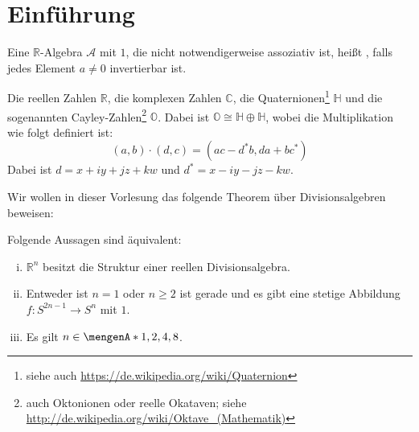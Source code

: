 
\newcommand{\fach}{$K$-Theorie und die Hopf-Invariante}
\newcommand{\semester}{SoSe 2015}
\newcommand{\homepage}{https://wwwmath.uni-muenster.de/reine/u/topos/lehre/SS2015/KTheorie-Hopf/Hopf.html}

\newcommand{\prof}{Dr.\ Ulrich Penning}
\publishers{\scalebox{14}{$K$}}



\maketitle
\begin{abstract}

\end{abstract}

\tableofcontents
\cleardoubleoddemptypage

\setcounter{page}{1}

\section*{Einführung} %
\label{sec:0}

\begin{definition*}[{name=[Definition: Reelle Divisionsalgebra]},label=sub:01,numbered=no]
Eine $\mathds{R}$-Algebra $\mathcal{A}$ mit $1$, die nicht notwendigerweise assoziativ ist, heißt , falls jedes Element $a\not= 0$ invertierbar 
ist.	
\end{definition*}

\begin{beispiel}
Die reellen Zahlen $\mathds{R}$, die komplexen Zahlen $\mathds{C}$, die Quaternionen\footnote{siehe auch \url{https://de.wikipedia.org/wiki/Quaternion}} $\mathds{H}$ und die sogenannten Cayley-Zahlen\footnote{auch Oktonionen oder reelle Okataven; siehe  \url{http://de.wikipedia.org/wiki/Oktave_(Mathematik)}} $\mathds{O}$. Dabei ist
$\mathds{O} \cong \mathds{H} \oplus \mathds{H}$, wobei die Multiplikation wie folgt definiert ist:
\[
	(a,b) \cdot (d,c) = (ac - d^* b, da + bc^*) 
\]
Dabei ist $d= x + iy + jz + kw$ und $d^* = x -iy -jz - kw$.
\end{beispiel}

\noindent Wir wollen in dieser Vorlesung das folgende Theorem über Divisionsalgebren beweisen:
\begin{theorem*}[name={Adams}]
Folgende Aussagen sind äquivalent:
\begin{enumerate}[(i)]
	\item $\mathds{R}^n$ besitzt die Struktur einer reellen Divisionsalgebra.
	\item Entweder ist $n=1$ oder $n \ge 2$ ist gerade und es gibt eine stetige Abbildung $f \colon S^{2n-1} \to S^n$ mit  $1$.
	\item Es gilt $n \in \set{1,2,4,8}$.
\end{enumerate}
\end{theorem*}

